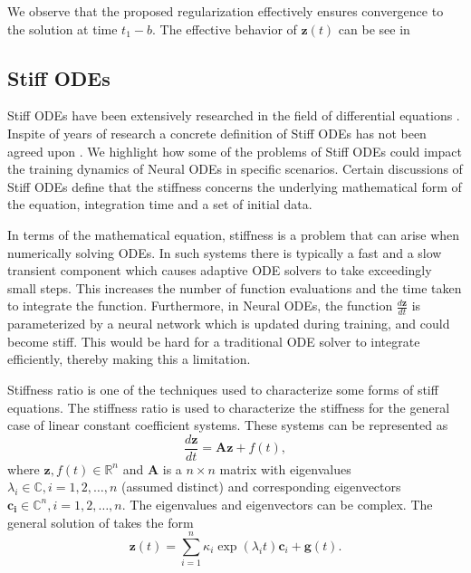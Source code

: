 We observe that the proposed regularization effectively ensures convergence to the solution at time $t_1-b$. The effective behavior of $\mathbf{z}(t)$ can be see in  

\subsection{Stiff ODEs} 
\label{subsection:stiff_ode}

Stiff ODEs have been extensively researched in the field of differential equations \cite{brugnano2011fifty}. Inspite of years of research a concrete definition of Stiff ODEs has not been agreed upon \cite{soderlind2015stiffness}. We highlight how some of the problems of Stiff ODEs could impact the training dynamics of Neural ODEs in specific scenarios. Certain discussions of Stiff ODEs define that the stiffness concerns the underlying mathematical form of the equation, integration time and a set of initial data.

In terms of the mathematical equation, stiffness is a problem that can arise when numerically solving ODEs. In such systems there is typically a fast and a slow transient component which causes adaptive ODE solvers to take exceedingly small steps. This increases the number of function evaluations and the time taken to integrate the function. %
Furthermore, in Neural ODEs, the function $\frac{d \mathbf{z} }{ dt }$ is parameterized by a neural network which is updated during training, and could become stiff. This would be hard for a traditional ODE solver to integrate efficiently, thereby making this a limitation.


Stiffness ratio is one of the techniques used to characterize some forms of stiff equations. The stiffness ratio is used to characterize the stiffness for the general case of linear constant coefficient systems. These systems can be represented as 
\begin{equation}
	\frac{d \mathbf{z} }{ dt } = \mathbf{Az} + f(t),
	\label{eq:stiff}
\end{equation}
where $\mathbf {z} ,f(t) \in \mathbb{R} ^{n}$ and $\mathbf {A}$ is a $n\times n$ matrix with eigenvalues  $\lambda_{i}\in \mathbb{C} ,i=1,2,\ldots ,n$ (assumed distinct) and corresponding eigenvectors  $\mathbf {c_{i}} \in \mathbb{C} ^{n},i=1,2,\ldots ,n$. The eigenvalues and eigenvectors can be complex. 
The general solution of  takes the form
\begin{equation}
	\mathbf {z}(t)=\sum_{i=1}^{n}\kappa_{i}\exp(\lambda _{i}t) \mathbf{c}_{i}+ \mathbf{g}(t) .
\end{equation}

